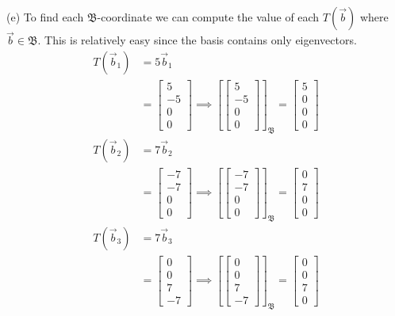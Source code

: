 \documentclass{report}
\begin{document}
(e) To find each $\mathfrak{B}$-coordinate we can compute the value of each $T(\vec{b})$ where $\vec{b}\in\mathfrak{B}$.  This is relatively easy since the basis contains only eigenvectors. 
$$
\begin{aligned}
T(\vec{b}_1) & = 5\vec{b}_1 \\
& =\begin{bmatrix}5\\-5\\0\\0\end{bmatrix} \implies \left[\begin{bmatrix}5\\-5\\0\\0\end{bmatrix}\right]_\mathfrak{B} = \begin{bmatrix}5\\0\\0\\0\end{bmatrix}
\end{aligned}
$$
$$
\begin{aligned}
T(\vec{b}_2) &= 7\vec{b}_2\\
&=\begin{bmatrix}-7\\-7\\0\\0\end{bmatrix}\implies
\left[\begin{bmatrix}-7\\-7\\0\\0\end{bmatrix}\right]_\mathfrak{B}=\begin{bmatrix}0\\7\\0\\0\end{bmatrix}
\end{aligned}
$$
$$
\begin{aligned}
T(\vec{b}_3) &= 7\vec{b}_3\\
&=\begin{bmatrix}0\\0\\7\\-7\end{bmatrix}\implies
\left[\begin{bmatrix}0\\0\\7\\-7\end{bmatrix}\right]_\mathfrak{B}=\begin{bmatrix}0\\0\\7\\0\end{bmatrix}
\end{aligned}
$$
\end{document}
